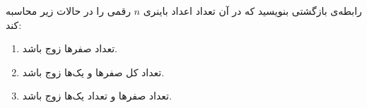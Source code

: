 \EXERCISE
رابطه‌‌ی بازگشتی بنویسید که در آن تعداد اعداد باینری
$n$
رقمی را در حالات زیر محاسبه کند:
\begin{enumerate}
\item
تعداد صفرها زوج باشد.
\item
تعداد کل صفرها و یک‌ها زوج باشد.
\item
تعداد صفرها و تعداد یک‌ها زوج باشد.
\end{enumerate}